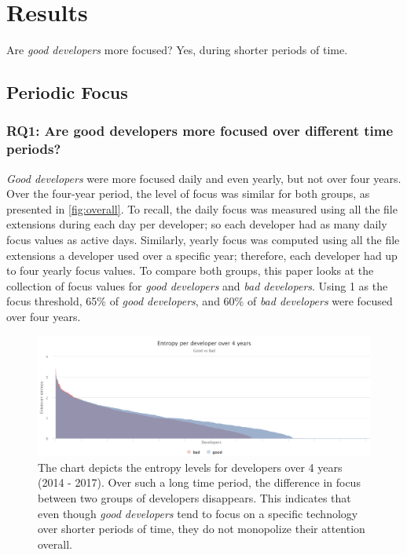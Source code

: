 
\chapter{Results}\label{chapter:results}
Are \textit{good developers} more focused? Yes, during shorter periods of time.

\section{Periodic Focus}

\subsection{RQ1: Are good developers more focused over different time periods?}

\textit{Good developers} were more focused daily and even yearly, but not over four years. Over the four-year period, the level of focus was similar for both groups, as presented in \autoref{fig:overall}. To recall, the daily focus was measured using all the file extensions during each day per developer; so each developer had as many daily focus values as active days. Similarly, yearly focus was computed using all the file extensions a developer used over a specific year; therefore, each developer had up to four yearly focus values. To compare both groups, this paper looks at the collection of focus values for \textit{good developers} and \textit{bad developers}. Using 1 as the focus threshold, 65\% of \textit{good developers}, and 60\% of \textit{bad developers} were focused over four years. 

\begin{figure}[htpb]
  \centering
  \includegraphics[width=1\textwidth]{figures/overall}
  \caption[Focus over 4 years]{The chart depicts the entropy levels for developers over 4 years (2014 - 2017). Over such a long time period, the difference in focus between two groups of developers disappears. This indicates that even though \textit{good developers} tend to focus on a specific technology over shorter periods of time, they do not monopolize their attention overall.} \label{fig:overall}
\end{figure}

